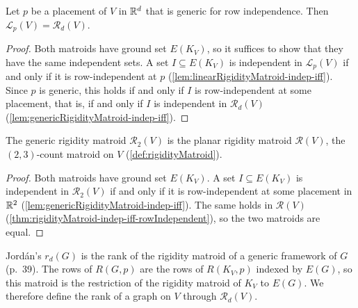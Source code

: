 \begin{lemma}
  \label{lem:linearRigidityMatroid-eq-genericRigidityMatroid}
  \leanok
  Let $p$ be a placement of $V$ in ${\mathbb{R}}^{d}$ that is generic for row
  independence. Then $\mathcal{L}_p(V) = \mathcal{R}_d(V)$.
\end{lemma}
\begin{proof}
  \leanok
  Both matroids have ground set $E(K_V)$, so it suffices to show that
  they have the same independent sets. A set $I \subseteq E(K_V)$ is
  independent in $\mathcal{L}_p(V)$ if and only if it is
  row-independent at $p$ (\cref{lem:linearRigidityMatroid-indep-iff}).
  Since $p$ is generic, this holds if and only if $I$ is
  row-independent at some placement, that is, if and only if $I$ is
  independent in $\mathcal{R}_d(V)$
  (\cref{lem:genericRigidityMatroid-indep-iff}).
\end{proof}

\begin{lemma}
  \label{lem:genericRigidityMatroid-two-eq-rigidityMatroid}
  \leanok
  The generic rigidity matroid $\mathcal{R}_2(V)$ is the planar
  rigidity matroid $\mathcal{R}(V)$, the $(2,3)$-count matroid on $V$
  (\cref{def:rigidityMatroid}).
\end{lemma}
\begin{proof}
  \leanok
  Both matroids have ground set $E(K_V)$. A set $I \subseteq E(K_V)$
  is independent in $\mathcal{R}_2(V)$ if and only if it is
  row-independent at some placement in ${\mathbb{R}}^{2}$
  (\cref{lem:genericRigidityMatroid-indep-iff}). The same holds in
  $\mathcal{R}(V)$ (\cref{thm:rigidityMatroid-indep-iff-rowIndependent}),
  so the two matroids are equal.
\end{proof}

Jord\'an's $r_d(G)$ is the rank of the rigidity matroid of a generic
framework of $G$ (p.~39). The rows of $R(G, p)$ are the rows of
$R(K_V, p)$ indexed by $E(G)$, so this matroid is the restriction of
the rigidity matroid of $K_V$ to $E(G)$. We therefore define the rank of
a graph on $V$ through $\mathcal{R}_d(V)$.

